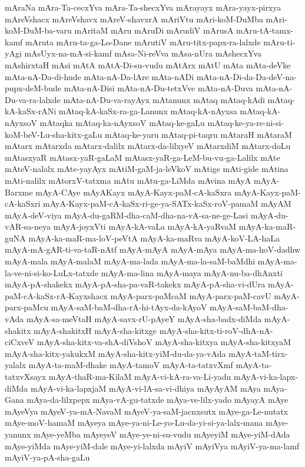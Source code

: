 {mAraNa
mAra-Ta-cecxYva
mAra-Ta-shecxYva
mArayayx
mAra-yayx-pirxya
mAreVshacx
mAreVshavx
mAreV-shavxrA
mAriVtu
mAri-koM-DuMba
mAri-koM-DuM-ba-varu
mAritaM
mAru
mAruDi
mArudiV
mArusA
mAru-tA-tamx-kamf
mAruta
mAru-ta-ga-Lo-Dane
mArutiV
mAru-titx-papx-ra-lalxde
mAru-ti-yAgi
mAsUyx-na-mA-si-kamf
mAsa-Ni-reVva
mAsa-nUra
mAshecxYva
mAshirxtaH
mAsi
mAtA
mAtA-Di-su-vudu
mAtArx
mAtU
mAta
mAta-deVke
mAta-nA-Da-di-hude
mAta-nA-Da-lAre
mAta-nADi
mAta-nA-Di-da-Da-deV-na-pupx-deM-bude
mAta-nA-Disi
mAta-nA-Du-tetxVve
mAta-nA-Duva
mAta-nA-Du-va-ra-lalxde
mAta-nA-Du-va-rayAyx
mAtanunx
mAtaq
mAtaq-kAdi
mAtaq-kA-kaSx-rANi
mAtaq-kA-kaSx-ra-ga-Lanunx
mAtaq-kA-nAyxsa
mAtaq-kA-nAyxsoV
mAtaqka
mAtaq-ka-nAyxsoV
mAtaq-ke-gaLu
mAtaq-ke-ya-re-ni-si-koM-beV-Lu-sha-kitx-gaLu
mAtaq-ke-yaru
mAtaq-pi-taqru
mAtaraH
mAtaraM
mAtarx
mAtarxda
mAtarx-dalilx
mAtarx-da-lilxyeV
mAtarxdiM
mAtarx-doLu
mAtasxyaR
mAtasx-yaR-gaLaM
mAtasx-yaR-ga-LeM-bu-vu-ga-Lalilx
mAte
mAteV-nalalx
mAte-yayAyx
mAtiM-gaM-ja-leVkoV
mAtige
mAti-gide
mAtina
mAti-nalilx
mAtorxV-tatxma
mAtu
mAtu-ga-LiMda
mAvina
mAyA
mAyA-Barxme
mAyA-CAye
mAyAKayx
mAyA-Kayx-paM-cA-kaSxra
mAyA-Kayx-paM-cA-kaSxri
mAyA-Kayx-paM-cA-kaSx-ri-ge-ya-SATx-kaSx-roV-pamaM
mAyAM
mAyA-deV-viya
mAyA-du-gaRM-dha-caM-dha-na-vA-sa-ne-ge-Lasi
mAyA-du-vAR-sa-neya
mAyA-joyxVti
mAyA-kA-vaLa
mAyA-kA-yaRvaM
mAyA-ka-maR-guNA
mAyA-ka-maR-ma-loV-peVtA
mAyA-ka-maRva
mAyA-koV-LA-haLa
mAyA-mA-gAR-ti-va-taR-nAtf
mAyA-mAyA
mAyA-mAya
mAyA-ma-hoV-dadhw
mAyA-mala
mAyA-malaM
mAyA-ma-lada
mAyA-ma-la-saM-baMdhi
mAyA-ma-la-ve-ni-si-ko-LuLx-tatxde
mAyA-ma-lina
mAyA-maya
mAyA-nu-ba-dhAnxti
mAyA-pA-shakekx
mAyA-pA-sha-pa-vaR-takekx
mAyA-pA-sha-vi-dUra
mAyA-paM-cA-kaSx-rA-Kayxshacx
mAyA-parx-paMcaM
mAyA-parx-paM-cavU
mAyA-parx-paMcu
mAyA-saM-baM-dha-rA-hi-tAyx-da-kAyoV
mAyA-saM-baM-dha-vAda
mAyA-sa-meVtaH
mAyA-savx-rU-pAyeY
mAyA-sha-badx-diMda
mAyA-shakitx
mAyA-shakitxH
mAyA-sha-kitxge
mAyA-sha-kitx-ti-roV-dhA-nA-ciCxveV
mAyA-sha-kitx-va-shA-diVshoV
mAyA-sha-kitxya
mAyA-sha-kitxyaM
mAyA-sha-kitx-yakukxM
mAyA-sha-kitx-yiM-du-da-ya-vAda
mAyA-taM-tirx-yalalx
mAyA-ta-maM-dhake
mAyA-tamoV
mAyA-ta-tatxvXmf
mAyA-ta-tatxvXsayx
mAyA-thaR-ma-KilaM
mAyA-vi-kA-ra-va-Li-yadu
mAyA-vi-ka-lapx-diMda
mAyA-vi-ka-lapxjaM
mAyA-vi-lA-sa-vi-dhiya
mAyAyAM
mAya
mAya-Gana
mAya-da-lilxpepx
mAya-vA-gu-tatxde
mAya-ve-lilx-yado
mAyayA
mAye
mAyeVya
mAyeV-ya-mA-NavaM
mAyeV-ya-saM-jacnxsutx
mAye-ga-Le-nutatx
mAye-moV-hamaM
mAyeya
mAye-ya-ni-Le-yo-Lu-da-yi-si-ya-lalx-mana
mAye-yanunx
mAye-yeMba
mAyeyeV
mAye-ye-ni-su-vudu
mAyeyiM
mAye-yiM-dAda
mAye-yiMda
mAye-yiM-dale
mAye-yi-lalxda
mAyiV
mAyiVya
mAyiV-ya-ma-lamf
mAyiV-ya-pA-sha-gaLu
}
